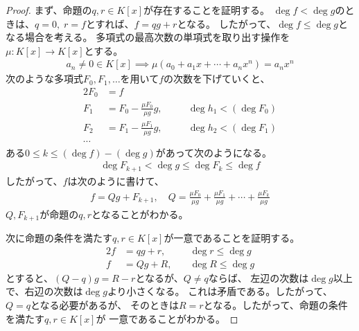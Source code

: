 {\begin{proof}
		まず、命題の$q,r\in K[x]$が存在することを証明する。
		$\deg f < \deg g$のときは、$q=0,\; r=f$とすれば、$f=qg+r$となる。
		したがって、$\deg f\le \deg g$となる場合を考える。
		多項式の最高次数の単項式を取り出す操作を$\mu:K[x]\to K[x]$とする。
		\begin{equation*}\begin{split}
			a_n\neq 0\in K[x] \implies \mu(a_0+a_1x +\cdots+ a_nx^n) = a_nx^n
		\end{split}\end{equation*}
		次のような多項式$F_0,F_1,\dots$を用いて$f$の次数を下げていくと、
		\begin{alignat*}{2}
			F_0 &= f \\
			F_1 &= F_0 - \frac{\mu F_0}{\mu g} g, &\quad &\deg h_1< (\deg F_0) \\
			F_2 &= F_1 - \frac{\mu F_1}{\mu g} g, &\quad &\deg h_2< (\deg F_1) \\
			\cdots
		\end{alignat*}
		ある$0\le k\le (\deg f)-(\deg g)$があって次のようになる。
		\begin{equation*}\begin{split}
			\deg F_{k+1}< \deg g\le \deg F_k\le \deg f
		\end{split}\end{equation*}
		したがって、$f$は次のように書けて、
		\begin{equation*}\begin{split}
			f = Qg + F_{k+1},\quad
			Q = \frac{\mu F_0}{\mu g} + \frac{\mu F_1}{\mu g}
				+\cdots+ \frac{\mu F_k}{\mu g}
		\end{split}\end{equation*}
		$Q,F_{k+1}$が命題の$q,r$となることがわかる。

		次に命題の条件を満たす$q,r\in K[x]$が一意であることを証明する。
		\begin{alignat*}{2}
			f &= qg + r, &\quad \deg r\le \deg g \\
			f &= Qg + R, &\quad \deg R\le \deg g
		\end{alignat*}
		とすると、$(Q-q)g=R-r$となるが、$Q\neq q$ならば、
		左辺の次数は$\deg g$以上で、右辺の次数は$\deg g$より小さくなる。
		これは矛盾である。したがって、$Q=q$となる必要があるが、
		そのときは$R=r$となる。したがって、命題の条件を満たす$q,r\in K[x]$が
		一意であることがわかる。
	\end{proof} %

}

